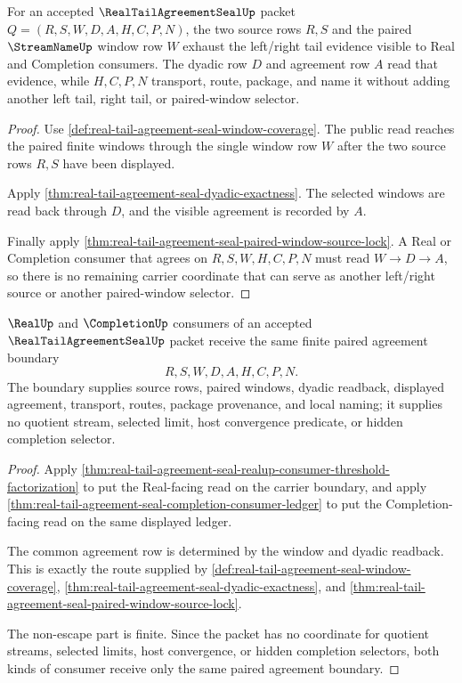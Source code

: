 \begin{theorem}
\label{thm:real-tail-agreement-seal-dual-source-window-exhaustion}
For an accepted $\RealTailAgreementSealUp$ packet $Q=(R,S,W,D,A,H,C,P,N)$, the two source rows $R,S$ and the paired $\StreamNameUp$ window row $W$ exhaust the left/right tail evidence visible to Real and Completion consumers. The dyadic row $D$ and agreement row $A$ read that evidence, while $H,C,P,N$ transport, route, package, and name it without adding another left tail, right tail, or paired-window selector.
\end{theorem}
\begin{proof}
Use \autoref{def:real-tail-agreement-seal-window-coverage}. The public read reaches the paired finite windows through the single window row $W$ after the two source rows $R,S$ have been displayed.

Apply \autoref{thm:real-tail-agreement-seal-dyadic-exactness}. The selected windows are read back through $D$, and the visible agreement is recorded by $A$.

Finally apply \autoref{thm:real-tail-agreement-seal-paired-window-source-lock}. A Real or Completion consumer that agrees on $R,S,W,H,C,P,N$ must read $W \to D \to A$, so there is no remaining carrier coordinate that can serve as another left/right source or another paired-window selector.
\end{proof}

\begin{theorem}
\label{thm:real-tail-agreement-seal-real-completion-boundary}
$\RealUp$ and $\CompletionUp$ consumers of an accepted $\RealTailAgreementSealUp$ packet receive the same finite paired agreement boundary
$$
R,S,W,D,A,H,C,P,N.
$$
The boundary supplies source rows, paired windows, dyadic readback, displayed agreement, transport, routes, package provenance, and local naming; it supplies no quotient stream, selected limit, host convergence predicate, or hidden completion selector.
\end{theorem}
\begin{proof}
Apply \autoref{thm:real-tail-agreement-seal-realup-consumer-threshold-factorization} to put the Real-facing read on the carrier boundary, and apply \autoref{thm:real-tail-agreement-seal-completion-consumer-ledger} to put the Completion-facing read on the same displayed ledger.

The common agreement row is determined by the window and dyadic readback. This is exactly the route supplied by \autoref{def:real-tail-agreement-seal-window-coverage}, \autoref{thm:real-tail-agreement-seal-dyadic-exactness}, and \autoref{thm:real-tail-agreement-seal-paired-window-source-lock}.

The non-escape part is finite. Since the packet has no coordinate for quotient streams, selected limits, host convergence, or hidden completion selectors, both kinds of consumer receive only the same paired agreement boundary.
\end{proof}

